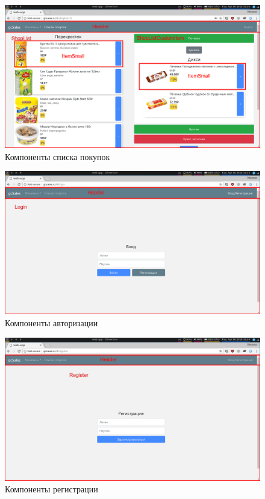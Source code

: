 \begin{figure}[H]
    \centering
    \includegraphics[width=\textwidth]{./screenshots/shoplist_border.png}
    \caption{\small{Компоненты списка покупок}}
    \label{database}
\end{figure}

\begin{figure}[H]
    \centering
    \includegraphics[width=\textwidth]{./screenshots/login_border.png}
    \caption{\small{Компоненты авторизации}}
    \label{database}
\end{figure}

\begin{figure}[H]
    \centering
    \includegraphics[width=\textwidth]{./screenshots/register_border.png}
    \caption{\small{Компоненты регистрации}}
    \label{database}
\end{figure}


